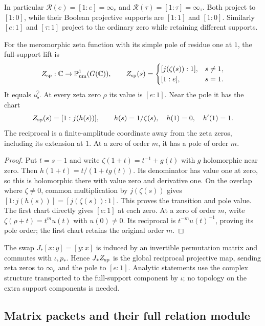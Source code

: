 In particular $\mathcal R(e)=[1:e]=\infty_e$ and $\mathcal R(\tau)=[1:\tau]=\infty_\tau$. Both project to $[1:0]$, while their Boolean projective supports are $[1:1]$ and $[1:0]$. Similarly $[e:1]$ and $[\tau:1]$ project to the ordinary zero while retaining different supports.

\begin{proposition}
\label{prop:sz-zeta-charts}
For the meromorphic zeta function with its simple pole of residue one at $1$, the full-support lift is
\[
Z_{\rm sp}:\mathbb C\to\mathbb P_{\rm um}^1(G(\mathbb C)),\qquad
Z_{\rm sp}(s)=
\begin{cases}
[j(\zeta(s)):1],&s\ne1,\\
[1:e],&s=1 .
\end{cases}
\]
It equals $\iota\widehat\zeta$. At every zeta zero $\rho$ its value is $[e:1]$. Near the pole it has the chart
\[
Z_{\rm sp}(s)=[1:j(h(s))],\qquad h(s)=1/\zeta(s),\quad h(1)=0,\quad h'(1)=1.
\]
The reciprocal is a finite-amplitude coordinate away from the zeta zeros, including its extension at $1$. At a zero of order $m$, it has a pole of order $m$.
\end{proposition}
\begin{proof}
Put $t=s-1$ and write $\zeta(1+t)=t^{-1}+g(t)$ with $g$ holomorphic near zero. Then $h(1+t)=t/(1+t g(t))$. Its denominator has value one at zero, so this is holomorphic there with value zero and derivative one. On the overlap where $\zeta\ne0$, common multiplication by $j(\zeta(s))$ gives $[1:j(h(s))]=[j(\zeta(s)):1]$. This proves the transition and pole value. The first chart directly gives $[e:1]$ at each zero. At a zero of order $m$, write $\zeta(\rho+t)=t^m u(t)$ with $u(0)\ne0$. Its reciprocal is $t^{-m}u(t)^{-1}$, proving its pole order; the first chart retains the original order $m$.
\end{proof}

The swap $J_*[x:y]=[y:x]$ is induced by an invertible permutation matrix and commutes with $\iota,p_*$. Hence $J_*Z_{\rm sp}$ is the global reciprocal projective map, sending zeta zeros to $\infty_e$ and the pole to $[e:1]$. Analytic statements use the complex structure transported to the full-support component by $\iota$; no topology on the extra support components is needed.

\subsection{Matrix packets and their full relation module}

